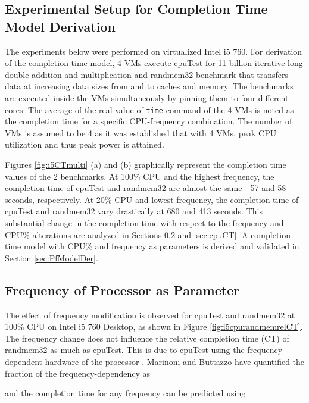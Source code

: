 \documentclass{sig-alternate}
\begin{document}
\subsection{Experimental Setup for Completion Time Model Derivation}
\label{expCT}
The experiments below were performed on virtualized Intel i5 760. For derivation of the completion time model, 4 VMs execute cpuTest for 11 billion iterative long double addition and multiplication and randmem32 \cite{randmem} benchmark that transfers data at increasing data sizes from and to caches and memory. The benchmarks are executed inside the VMs simultaneously by pinning them to four different cores. The average of the real value of \texttt{time} command of the 4 VMs is noted as the completion time for a specific CPU-frequency combination. The number of VMs is assumed to be 4 as it was established that with 4 VMs, peak CPU utilization and thus peak power is attained.

Figures \ref{fig:i5CTmulti} (a) and (b) graphically represent the completion time values of the 2 benchmarks. At 100\% CPU and the highest frequency, the completion time of cpuTest and randmem32 are almost the same - 57 and 58 seconds, respectively. At 20\% CPU and lowest frequency, the completion time of cpuTest and randmem32 vary drastically at 680 and 413 seconds. This substantial change in the completion time with respect to the frequency and CPU\% alterations are analyzed in Sections \ref{sec:freqCT} and \ref{sec:cpuCT}. A completion time model with CPU\% and frequency as parameters is derived and validated in Section \ref{sec:PfModelDer}.

\vspace{-0.1cm}

\subsection{Frequency of Processor as Parameter}
\label{sec:freqCT}
The effect of frequency modification is observed for cpuTest and randmem32 at 100\% CPU on Intel i5 760 Desktop, as shown in Figure \ref{fig:i5cpurandmemrelCT}. The frequency change does not influence the relative completion time (CT) of randmem32 as much as cpuTest. This is due to cpuTest using the frequency-dependent hardware of the processor \cite{Venkatachalam2006}. 
Marinoni and Buttazzo \cite{Marinoni2007} have quantified the fraction of the frequency-dependency  as 

and the completion time for any frequency can be predicted using 
\end{document}
